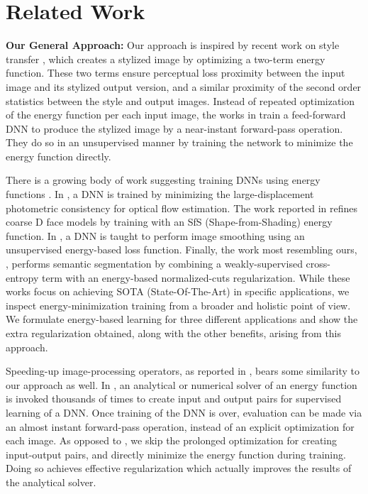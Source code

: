 \documentclass[journal]{IEEEtran}
\newcommand{\smallpar}[1]{\textbf{#1}\hspace{0.2cm}}
\begin{document}
\section{Related Work}\label{s:related_work}

\noindent \smallpar{Our General Approach:} 
Our approach is inspired by recent work on style transfer \cite{style_transfer}, which creates a stylized image by optimizing a two-term energy function. These two terms ensure perceptual loss proximity between the input image and its stylized output version, and a similar proximity of the second order statistics between the style and output images. Instead of repeated optimization of the energy function per each input image, the works in \cite{FF_style_transfer,FF_texture} train a feed-forward DNN to produce the stylized image by a near-instant forward-pass operation. They do so in an unsupervised manner by training the network to minimize the energy function directly. 

There is a growing body of work suggesting training DNNs using energy functions \cite{unsupervised_optical_flow,unsupervised_face_reconstruction,unsupervised_smoothing,normalized_cut_energy}.
In \cite{unsupervised_optical_flow}, a DNN is trained by minimizing the large-displacement photometric consistency for optical flow estimation. The work reported in \cite{unsupervised_face_reconstruction} refines coarse D face models by training with an SfS (Shape-from-Shading) energy function. In \cite{unsupervised_smoothing}, a DNN is taught to perform image smoothing using an unsupervised energy-based loss function. Finally, the work most resembling ours, \cite{normalized_cut_energy}, performs semantic segmentation by combining a weakly-supervised cross-entropy term with an energy-based normalized-cuts regularization. While these works focus on achieving SOTA (State-Of-The-Art) in specific applications, we inspect energy-minimization training from a broader and holistic point of view. We formulate energy-based learning for three different applications and show the extra regularization obtained, along with the other benefits, arising from this approach.

Speeding-up image-processing operators, as reported in \cite{fast_image_processing}, bears some similarity to our approach as well. In \cite{fast_image_processing}, an analytical or numerical solver of an energy function is invoked thousands of times to create input and output pairs for supervised learning of a DNN. Once training of the DNN is over, evaluation can be made via an almost instant forward-pass operation, instead of an explicit optimization for each image. As opposed to \cite{fast_image_processing}, we skip the prolonged optimization for creating input-output pairs, and directly minimize the energy function during training. Doing so achieves effective regularization which actually improves the results of the analytical solver.
\end{document}
